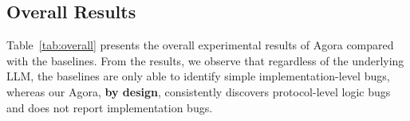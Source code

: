\documentclass{article}
\theoremstyle{plain}
\theoremstyle{definition}
\theoremstyle{remark}
\newcommand{\consensustester}{Agora\xspace}
\newcommand{\agentc}{TestGen\xspace}
\begin{document}
\subsection{Overall Results}
\label{sec:expoverall}








Table~\ref{tab:overall} presents the overall experimental results of \consensustester compared with the baselines. From the results, we observe that regardless of the underlying LLM, the baselines are only able to identify simple implementation-level bugs, whereas our \consensustester, \textbf{by design}, consistently discovers protocol-level logic bugs and does not report implementation bugs.
\end{document}
